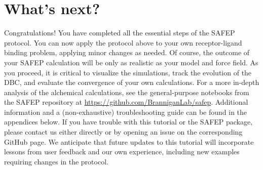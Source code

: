 \documentclass[9pt,tutorial,pubversion]{Styling/livecoms}
\begin{document}
\section{What's next?}

Congratulations! You have completed all the essential steps of the SAFEP protocol. You can now apply the protocol above to your own receptor-ligand binding problem, applying minor changes as needed. Of course, the outcome of your SAFEP calculation will be only as realistic as your model and force field.
As you proceed, it is critical to visualize the simulations, track the evolution of the DBC, and evaluate the convergence of your own calculations.
For a more in-depth analysis of the alchemical calculations, see the general-purpose notebooks from the SAFEP repository at \url{https://github.com/BranniganLab/safep}. 
Additional information and a (non-exhaustive) troubleshooting guide can be found in the appendices below.
If you have trouble with this tutorial or the SAFEP package, please contact us either directly or by opening an issue on the corresponding GitHub page.
We anticipate that future updates to this tutorial will incorporate lessons from user feedback and our own experience, including new examples requiring changes in the protocol.
\end{document}
